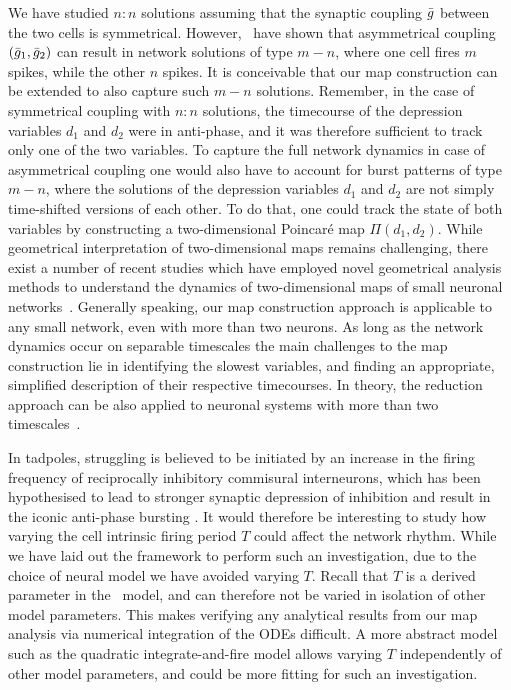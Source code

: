 We have studied $n:n$ solutions assuming that the synaptic coupling $\bar g $ between the two cells is symmetrical.
However,~\citet{bose2011} have shown that asymmetrical coupling $(\bar g_1, \bar g_2)$ can result in network solutions of type $m-n$, where one cell fires $m$ spikes, while the other $n$ spikes.
It is conceivable that our map construction can be extended to also capture such $m-n$ solutions.
Remember, in the case of symmetrical coupling with $n:n$ solutions, the timecourse of the depression variables $d_{1}$ and $d_{2}$ were in anti-phase, and it was therefore sufficient to track only one of the two variables.
To capture the full network dynamics in case of asymmetrical coupling one would also have to account for burst patterns of type $m-n$, where the solutions of the depression variables $d_1$ and $d_2$ are not simply time-shifted versions of each other.
To do that, one could track the state of both variables by constructing a two-dimensional Poincaré map $\Pi(d_1,d_2)$.
While geometrical interpretation of two-dimensional maps remains challenging, there exist a number of recent studies which have employed novel geometrical analysis methods to understand the dynamics of two-dimensional maps of small neuronal networks~\citep{akcay2014,akcay2018,liao2020}.
Generally speaking, our map construction approach is applicable to any small network, even with more than two neurons.
As long as the network dynamics occur on separable timescales the main challenges to the map construction lie in identifying the slowest variables, and finding an appropriate, simplified description of their respective timecourses.
In theory, the reduction approach can be also applied to neuronal systems with more than two timescales~\citep[e.g. see][]{kuehn2015}.

In tadpoles, struggling is believed to be initiated by an increase in the firing frequency of reciprocally inhibitory commisural interneurons, which has been hypothesised to lead to stronger synaptic depression of inhibition and result in the iconic anti-phase bursting \citep{li2007}.
It would therefore be interesting to study how varying the cell intrinsic firing period $T$ could affect the network rhythm.
While we have laid out the framework to perform such an investigation, due to the choice of neural model we have avoided varying $T$.
Recall that $T$ is a derived parameter in the~\citet{morris1981} model, and can therefore not be varied in isolation of other model parameters.
This makes verifying any analytical results from our map analysis via numerical integration of the ODEs difficult.
A more abstract model such as the quadratic integrate-and-fire model \citep{izhikevich2004} allows varying $T$ independently of other model parameters, and could be more fitting for such an investigation.

